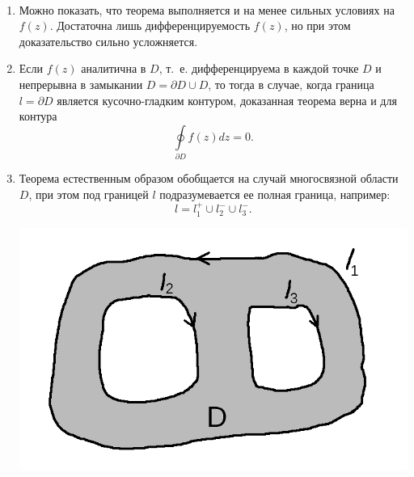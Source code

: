 \documentclass[../../main.tex]{subfiles}
\begin{document}
\begin{rems}
	\
\begin{enumerate}
		\item Можно показать, что теорема выполняется и на менее сильных
			условиях на $f(z)$. Достаточна лишь дифференцируемость $f(z)$,
			но при этом доказательство сильно усложняется.
		\item Если $f(z)$ аналитична в $D$, т.~е. дифференцируема в каждой
			точке $D$ и непрерывна в замыкании $D = \partial D \cup D$,
			то тогда в случае, когда граница $ l = \partial D$ является
			кусочно-гладким контуром, доказанная теорема верна и для
			контура
			\[ \oint\limits_{\partial D} f(z) dz = 0. \]
		\item Теорема естественным образом обобщается на случай
			многосвязной области $D$, при этом под границей $l$
			подразумевается ее полная граница, например:
			\[ l = l_1^+ \cup l_2^- \cup l_3^-.\]
			\begin{center}
			\includegraphics[scale = 0.3]{lec31_1.png}
			\end{center}
\end{enumerate}
\end{rems}
\end{document}
